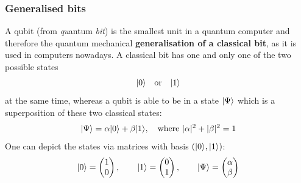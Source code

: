 \documentclass[bibliography=totocnumbered]{article}
\theoremstyle{NoticeStyle}
\begin{document}
\subsubsection{Generalised bits}
A qubit (from \textit{qu}antum \textit{bit}) is the smallest unit in a quantum computer and therefore the quantum mechanical \textbf{generalisation of a classical bit}, as it is used in computers nowadays. A classical bit has one and only one of the two possible states
%
\begin{align}
	{\left\vert{0}\right\rangle} \quad \text{or} \quad {\left\vert{1}\right\rangle}
\end{align}
%
at the same time, whereas a qubit is able to be in a state ${\left\vert{\Psi}\right\rangle}$ which is a superposition of these two classical states:
%
\begin{align}
	{\left\vert{\Psi}\right\rangle} = \alpha {\left\vert{0}\right\rangle} + \beta {\left\vert{1}\right\rangle}, \quad \text{where }|\alpha|^2 + |\beta|^2 = 1	\label{eq:Superpos of qubit}
\end{align}
%
%
One can depict the states via matrices with basis $({\left\vert{0}\right\rangle}, {\left\vert{1}\right\rangle})$:
\begin{align}
	{\left\vert{0}\right\rangle} = \begin{pmatrix}1\\0 \end{pmatrix}, \quad\quad {\left\vert{1}\right\rangle} = \begin{pmatrix}0\\1 \end{pmatrix}, \quad\quad {\left\vert{\Psi}\right\rangle} = \begin{pmatrix}\alpha\\\beta \end{pmatrix}
\end{align}
\end{document}
